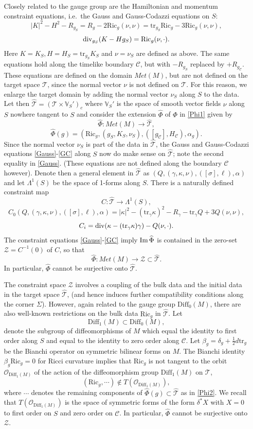 \documentclass[10pt]{amsart}
\renewcommand{\a}{\alpha}
\renewcommand{\b}{\beta}
\newcommand{\g}{\gamma}
\renewcommand{\d}{\delta}
\newcommand{\s}{\sigma}
\newcommand{\Si}{\Sigma}
\renewcommand{\k}{\kappa}
\newcommand{\cO}{{\mathcal O}}
\newcommand{\cC}{{\mathcal C}}
\newcommand{\cT}{{\mathcal T}}
\newcommand{\cZ}{\mathcal Z}
\newcommand{\bV}{\mathbb V}
\newcommand{\Ric}{\mathrm{Ric}}
\newcommand{\Diff}{\mathrm{Diff}}
\newcommand{\be}{\begin{equation}}
\newcommand{\ee}{\end{equation}}
\newcommand{\tr}{\mathrm{tr}}
\renewcommand{\to}{\rightarrow}
\renewcommand{\hat}{\widehat}
\newcommand{\<}{\langle}
\renewcommand{\>}{\rangle}
\theoremstyle{plain}
\theoremstyle{remark}
\theoremstyle{definition}
\numberwithin{equation}{section}
\begin{document}
  Closely related to the gauge group are the Hamiltonian and momentum constraint equations, i.e.~the Gauss and Gauss-Codazzi equations 
on $S$: 
\be \label{Gauss}
|K|^2 - H^2 - R_{g_S} = R_g - 2\Ric_g(\nu,\nu) = \tr_{g_S}\Ric_g - 3\Ric_g(\nu,\nu),
\ee
\be \label{GC} 
{\rm div}_{g_S}(K - Hg_S) = \Ric_g(\nu, \cdot). 
\ee 
Here $K = K_S, H = H_S = \tr_{g_S}K_S$ and $\nu = \nu_S$ are defined as above. The same equations hold along the timelike boundary $\cC$, 
but with $-R_{g_S}$ replaced by $+R_{g_{\cC}}$. These equations are defined on the domain $Met(M)$, but are not defined on the target 
space $\cT$, since the normal vector $\nu$ is not defined on $\cT$. For this reason, we enlarge the target domain by adding the normal 
vector $\nu_S$ along $S$ to the data. Let then $\hat \cT = (\cT \times \bV_S')_c$ where $\bV_S'$ is the space of smooth vector fields $\nu$ along $S$ 
nowhere tangent to $S$ and consider the extension $\hat \Phi$ of $\Phi$ in \eqref{Phi1} given by 
\be \label{Phi2}
\hat \Phi: Met(M) \to \hat \cT,
\ee
$$\hat \Phi(g) = (\Ric_g, (g_S, K_S, \nu_S), ([g_{\cC}], H_{\cC}), \a_g).$$ 
 Since the normal vector $\nu_S$ is part of the data in $\hat \cT$, the Gauss and Gauss-Codazzi equations \eqref{Gauss}-\eqref{GC} along 
$S$ now do make sense on $\hat \cT$; note the second equality in \eqref{Gauss}. (These equations are not defined along the boundary $\cC$ 
however). Denote then a general element in $\hat \cT$ as $(Q, (\g, \k, \nu), ([\s], \ell), \a)$ and let $\Lambda^1(S)$ be the 
space of 1-forms along $S$. There is a naturally defined constraint map 
\be \label{Const}
C: \hat \cT \to \Lambda^1(S),
\ee
$$C_0(Q, (\g, \k, \nu), ([\s], \ell), \a) = |\k|^2 - (\tr_{\g} \k)^2 - R_{\g} -  \tr_{\g} Q + 3Q(\nu,\nu),$$
$$C_i = {\rm div} (\k - (\tr_{\g}\k)\g) - Q(\nu, \cdot) .$$
The constraint equations \eqref{Gauss}-\eqref{GC} imply  ${\rm Im} \, \hat \Phi$ is contained in the zero-set $\cZ = C^{-1}(0)$ of $C$, 
so that 
\be \label{F2}
\hat \Phi: Met(M) \to \cZ \subset \hat \cT.
\ee
In particular, $\hat \Phi$ cannot be surjective onto $\hat \cT$. 
 
  The constraint space $\cZ$ involves a coupling of the bulk data and the initial data in the target space $\hat \cT$, (and hence induces further 
compatibility conditions along the corner $\Si$). However, again related to the gauge group $\Diff_0(M)$, there are also well-known restrictions 
on the bulk data $\Ric_g$ in $\hat \cT$. Let 
$$\Diff_1(M) \subset \Diff_0(M),$$
denote the subgroup of diffeomorphisms of $M$ which equal the identity to first order along $S$ and equal to the identity to zero 
order along $\cC$. Let $\b_g = \d_g + \frac{1}{2}d\tr_g$ be the Bianchi operator on symmetric bilinear forms on $M$. The Bianchi identity 
$\b_g \Ric_g = 0$ for Ricci curvature implies that $\Ric_g$ is not tangent to the orbit $\cO_{\Diff_1(M)}$ of the action of the diffeomorphism group 
$\Diff_1(M)$ on $\hat \cT$, 
$$(\Ric_g, \cdots)  \notin T(\cO_{\Diff_1(M)}),$$
where $\cdots$ denotes the remaining components of $\hat \Phi(g) \subset \hat \cT$ as in \eqref{Phi2}. We recall that $T(\cO_{\Diff_1(M)})$ is the 
space of symmetric forms of the form $\d^*X$ with $X = 0$ to first order on $S$ and zero order on $\cC$. In particular, $\hat \Phi$ cannot be 
surjective onto $\cZ$. 
\end{document}
